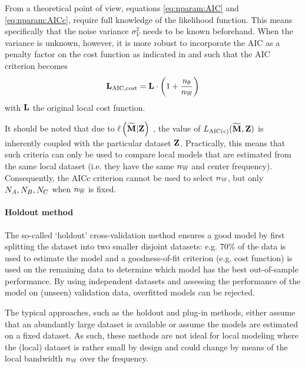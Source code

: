 \begin{remark}
From a theoretical point of view, equations \eqref{eq:nparam:AIC} and \eqref{eq:nparam:AICc}, require full knowledge of the likelihood function.
This means specifically that the noise variance $\sigma^{2}_{V}$ needs to be known beforehand.
When the variance is unknown, however, it is more robust to incorporate the \gls{AIC} as a penalty factor on the cost function as indicated in \citet[Section 7.4]{Ljung1999} and \citet[Section  11.3 and 19.7]{Pintelon2012} such that the \gls{AIC} criterion becomes
\begin{equation}
  \mathbf{L}_{\mathrm{AIC,cost}} = \mathbf{L} \cdot \left( 1 + \frac{n_{\theta}}{n_{\mathbb{W}}} \right)
\end{equation}
with $\mathbf{L}$ the original local cost function.
\end{remark}

\begin{remark}
It should be noted that due to $\operatorname{\ell}\left( \mathbf{\widetilde{M}}_{}  | \mathbf{Z} \right) $ , the value of $L_{\mathrm{AIC(c)}}(\mathbf{\widetilde{M}}_{} ,\mathbf{Z})$ is inherently coupled with the particular dataset $\mathbf{Z}$.
Practically, this means that such criteria can only be used to compare local models that are estimated from the same local dataset (i.e. they have the same $n_{\mathbb{W}}$ and center frequency).
Consequently, the \gls{AICc} criterion cannot be used to select $n_{\mathbb{W}}$, but only $N_{A},N_{B},N_{C}$ when $n_{\mathbb{W}}$ is fixed.
\end{remark}

\paragraph{Holdout method}
The so-called `holdout' cross-validation method ensures a good model by first splitting the dataset into two smaller disjoint datasets: e.g. $70\%$ of the data  is used to estimate the model and a goodness-of-fit criterion (e.g. cost function) is used on the remaining data to determine which model has the best out-of-sample performance.
By using independent datasets and assessing the performance of the model on (unseen) validation data, overfitted models can be rejected.

\begin{remark}
The typical approaches, such as the holdout and plug-in methods, either assume that an abundantly large dataset is available or  assume the models are estimated on a fixed dataset.
As such, these methods are not ideal for local modeling where the (local) dataset is rather small by design and could change by means of the local bandwidth $n_{\mathbb{W}}$ over the frequency.
\end{remark}

